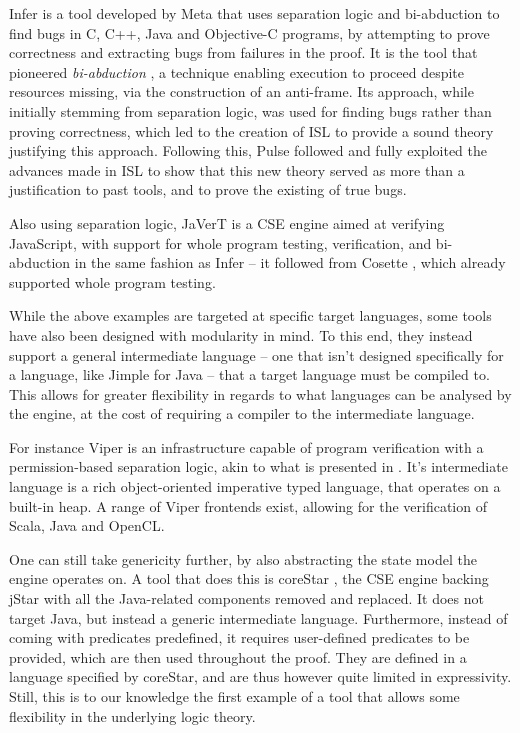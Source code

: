 Infer \cite{infer} is a tool developed by Meta that uses separation logic and bi-abduction to find bugs in C, C++, Java and Objective-C programs, by attempting to prove correctness and extracting bugs from failures in the proof. It is the tool that pioneered \emph{bi-abduction} \cite{biabduction}, a technique enabling execution to proceed despite resources missing, via the construction of an anti-frame. Its approach, while initially stemming from separation logic, was used for finding bugs rather than proving correctness, which led to the creation of ISL \cite{isl} to provide a sound theory justifying this approach. Following this, Pulse \cite{pulse} followed and fully exploited the advances made in ISL to show that this new theory served as more than a justification to past tools, and to prove the existing of true bugs.

Also using separation logic, JaVerT \cite{javert1, javert2} is a CSE engine aimed at verifying JavaScript, with support for whole program testing, verification, and bi-abduction in the same fashion as Infer -- it followed from Cosette \cite{cosette}, which already supported whole program testing.

While the above examples are targeted at specific target languages, some tools have also been designed with modularity in mind. To this end, they instead support a general intermediate language -- one that isn't designed specifically for a language, like Jimple for Java -- that a target language must be compiled to. This allows for greater flexibility in regards to what languages can be analysed by the engine, at the cost of requiring a compiler to the intermediate language.

For instance Viper \cite{viper} is an infrastructure capable of program verification with a permission-based separation logic, akin to what is presented in \cite{fracpermissions}. It's intermediate language is a rich object-oriented imperative typed language, that operates on a built-in heap. A range of Viper frontends exist, allowing for the verification of Scala, Java and OpenCL.

One can still take genericity further, by also abstracting the state model the engine operates on. A tool that does this is coreStar \cite{corestar}, the CSE engine backing jStar with all the Java-related components removed and replaced. It does not target Java, but instead a generic intermediate language. Furthermore, instead of coming with predicates predefined, it requires user-defined predicates to be provided, which are then used throughout the proof. They are defined in a language specified by coreStar, and are thus however quite limited in expressivity. Still, this is to our knowledge the first example of a tool that allows some flexibility in the underlying logic theory.

